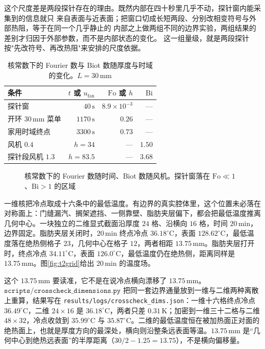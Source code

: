 这个尺度差是两段探针存在的理由。既然内部在四十秒里几乎不动，探针窗内能采集到的信息就只
来自表面与近表面；把窗口切成长短两段、分别改相变符号与外部热阻，等于在同一个几乎静止的
内部之上做两组不同的边界实验，两组结果的差别才归因于外部参数，而不是内部状态的变化。
这一组量级，就是两段探针按"先改符号、再改热阻"来安排的尺度依据。



\begin{table}[htbp]
\centering
\caption{核常数下的 Fourier 数与 Biot 数随厚度与时域的变化。\(L=30\,\mathrm{mm}\)}
\label{tab:fobi}
\setlength{\tabcolsep}{3.2pt}
{\small
\begin{tabular}{lrrr}
\toprule
条件 & \(t\) 或 \(u_{\mathrm{fan}}\) & \(\mathrm{Fo}\) 或 \(h\) & \(\mathrm{Bi}\) \\
\midrule
探针窗 & \(40\,\mathrm{s}\) & \(8.9\times 10^{-3}\) & --- \\
开环 \(30\,\mathrm{mm}\) 菜单 & \(1170\,\mathrm{s}\) & \(0.26\) & --- \\
家用时域终点 & \(3300\,\mathrm{s}\) & \(0.73\) & --- \\
风机 \(0.4\) & \(h=34\) & --- & \(1.50\) \\
探针段风机 \(1.3\) & \(h=83.5\) & --- & \(3.68\) \\
\bottomrule
\end{tabular}}
\end{table}

\begin{figure}[t]
\centering
{}
\caption{核常数下的 Fourier 数随时间、Biot 数随风机。探针窗落在 \(\mathrm{Fo}\ll 1\)、\(\mathrm{Bi}>1\) 的区域}
\label{fig:fobi}
\end{figure}

一维核把冷点取成十六条中的最低温度。有边界的真实腔体里，这个位置未必落在对称面上：门缝漏汽、搁架遮挡、一侧靠壁、脂肪夹层偏下，都会把最低温度推离几何中心。一块独立的二维显式截面沿厚度 \(24\) 格、沿横向 \(16\) 格，时间 \(20\,\mathrm{min}\)，边界固定。脂肪夹层关闭时，\(20\,\mathrm{min}\) 终点冷点 \(36.18^\circ\mathrm{C}\)，表面 \(128.62^\circ\mathrm{C}\)，最低温度落在绝热侧格子 \(23\)，几何中心在格子 \(12\)，两者相距 \(13.75\,\mathrm{mm}\)。脂肪夹层打开时，终点冷点 \(34.11^\circ\mathrm{C}\)，表面 \(126.0^\circ\mathrm{C}\)，最低温度仍在绝热侧，距离同样是 \(13.75\,\mathrm{mm}\)。图\ref{fig:t2grid}{}给出 \(20\,\mathrm{min}\) 的温度场。

这个 \(13.75\,\mathrm{mm}\) 要读准，它不是在说冷点横向漂移了 \(13.75\,\mathrm{mm}\)。\(\texttt{scripts/crosscheck\_dimensions.py}\) 把同一套边界通量放到一维与二维两种离散上重算，结果写在 \texttt{results/logs/crosscheck\_dims.json}：一维十六格终点冷点 \(36.49^\circ\mathrm{C}\)，二维 \(24\times16\) 是 \(36.18^\circ\mathrm{C}\)，两者只差 \(0.31\,\mathrm{K}\)；加密到一维三十二格与二维 \(48\times32\)，冷点收敛到 \(35.99^\circ\mathrm{C}\) 与 \(35.87^\circ\mathrm{C}\)。二维的最低温度恒在被加热面正对面的绝热面上，也就是厚度方向的最深处，横向则沿整条远表面等温。\(13.75\,\mathrm{mm}\) 是“几何中心到绝热远表面”的半厚距离（\(30/2-1.25=13.75\)），不是横向偏移量。

